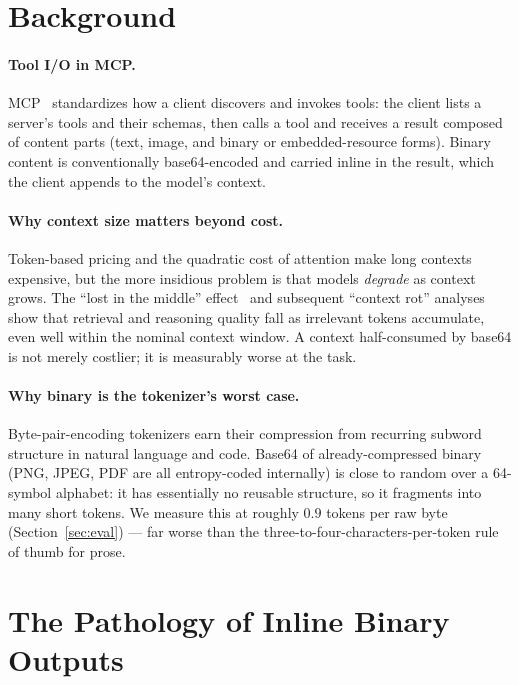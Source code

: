 \documentclass[11pt]{article}
\begin{document}
\section{Background}\label{sec:background}

\paragraph{Tool I/O in MCP.} MCP~\citep{mcp} standardizes how a client discovers and invokes tools: the client lists a server's tools and their schemas, then calls a tool and receives a result composed of content parts (text, image, and binary or embedded-resource forms). Binary content is conventionally base64-encoded and carried inline in the result, which the client appends to the model's context.

\paragraph{Why context size matters beyond cost.} Token-based pricing and the quadratic cost of attention make long contexts expensive, but the more insidious problem is that models \emph{degrade} as context grows. The ``lost in the middle'' effect~\citep{lostmiddle} and subsequent ``context rot'' analyses~\citep{contextrot} show that retrieval and reasoning quality fall as irrelevant tokens accumulate, even well within the nominal context window. A context half-consumed by base64 is not merely costlier; it is measurably worse at the task.

\paragraph{Why binary is the tokenizer's worst case.} Byte-pair-encoding tokenizers earn their compression from recurring subword structure in natural language and code. Base64 of already-compressed binary (PNG, JPEG, PDF are all entropy-coded internally) is close to random over a 64-symbol alphabet: it has essentially no reusable structure, so it fragments into many short tokens. We measure this at roughly $0.9$ tokens per raw byte (Section~\ref{sec:eval}) --- far worse than the three-to-four-characters-per-token rule of thumb for prose.

\section{The Pathology of Inline Binary Outputs}\label{sec:pathology}
\end{document}
